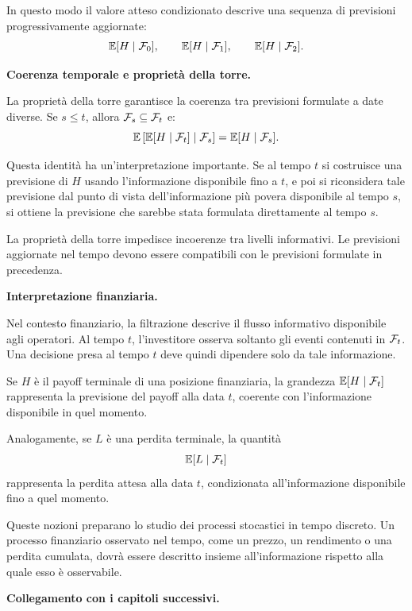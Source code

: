 In questo modo il valore atteso condizionato descrive una sequenza di
previsioni progressivamente aggiornate:
\[
\mathbb{E}[H\mid\mathcal{F}_0],
\qquad
\mathbb{E}[H\mid\mathcal{F}_1],
\qquad
\mathbb{E}[H\mid\mathcal{F}_2].
\]

\medskip

\noindent
\textbf{Coerenza temporale e propriet\`{a} della torre.}

La propriet\`{a} della torre garantisce la coerenza tra previsioni formulate a
date diverse. Se $s\leq t$, allora $\mathcal{F}_s\subseteq\mathcal{F}_t$ e:
\[
\mathbb{E}\left[
\mathbb{E}[H\mid\mathcal{F}_t]
\mid
\mathcal{F}_s
\right]
=
\mathbb{E}[H\mid\mathcal{F}_s].
\]

Questa identit\`{a} ha un'interpretazione importante. Se al tempo $t$ si
costruisce una previsione di $H$ usando l'informazione disponibile fino a
$t$, e poi si riconsidera tale previsione dal punto di vista dell'informazione
pi\`{u} povera disponibile al tempo $s$, si ottiene la previsione che sarebbe
stata formulata direttamente al tempo $s$.

La propriet\`{a} della torre impedisce incoerenze tra livelli informativi. Le
previsioni aggiornate nel tempo devono essere compatibili con le previsioni
formulate in precedenza.

\medskip

\noindent
\textbf{Interpretazione finanziaria.}

Nel contesto finanziario, la filtrazione descrive il flusso informativo
disponibile agli operatori. Al tempo $t$, l'investitore osserva soltanto gli
eventi contenuti in $\mathcal{F}_t$. Una decisione presa al tempo $t$ deve
quindi dipendere solo da tale informazione.

Se $H$ \`{e} il payoff terminale di una posizione finanziaria, la grandezza
$\mathbb{E}[H\mid\mathcal{F}_t]$ rappresenta la previsione del payoff alla data
$t$, coerente con l'informazione disponibile in quel momento.

Analogamente, se $L$ \`{e} una perdita terminale, la quantit\`{a}
\[
\mathbb{E}[L\mid\mathcal{F}_t]
\]
rappresenta la perdita attesa alla data $t$, condizionata all'informazione
disponibile fino a quel momento.

Queste nozioni preparano lo studio dei processi stocastici in tempo discreto.
Un processo finanziario osservato nel tempo, come un prezzo, un rendimento o
una perdita cumulata, dovr\`{a} essere descritto insieme all'informazione
rispetto alla quale esso \`{e} osservabile.

\medskip

\noindent
\textbf{Collegamento con i capitoli successivi.}

